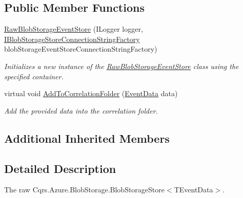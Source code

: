 \subsection*{Public Member Functions}
\begin{DoxyCompactItemize}
\item 
\hyperlink{classCqrs_1_1Azure_1_1BlobStorage_1_1Events_1_1BlobStorageEventStore_1_1RawBlobStorageEventStore_a42832e52a20eeb7012526624181f457c_a42832e52a20eeb7012526624181f457c}{Raw\+Blob\+Storage\+Event\+Store} (I\+Logger logger, \hyperlink{interfaceCqrs_1_1Azure_1_1BlobStorage_1_1IBlobStorageStoreConnectionStringFactory}{I\+Blob\+Storage\+Store\+Connection\+String\+Factory} blob\+Storage\+Event\+Store\+Connection\+String\+Factory)
\begin{DoxyCompactList}\small\item\em Initializes a new instance of the \hyperlink{classCqrs_1_1Azure_1_1BlobStorage_1_1Events_1_1BlobStorageEventStore_1_1RawBlobStorageEventStore}{Raw\+Blob\+Storage\+Event\+Store} class using the specified container. \end{DoxyCompactList}\item 
virtual void \hyperlink{classCqrs_1_1Azure_1_1BlobStorage_1_1Events_1_1BlobStorageEventStore_1_1RawBlobStorageEventStore_abc257daaf9e528dc5d6ddfff649bdeda_abc257daaf9e528dc5d6ddfff649bdeda}{Add\+To\+Correlation\+Folder} (\hyperlink{classCqrs_1_1Events_1_1EventData}{Event\+Data} data)
\begin{DoxyCompactList}\small\item\em Add the provided {\itshape data}  into the correlation folder. \end{DoxyCompactList}\end{DoxyCompactItemize}
\subsection*{Additional Inherited Members}


\subsection{Detailed Description}
The raw Cqrs.\+Azure.\+Blob\+Storage.\+Blob\+Storage\+Store$<$\+T\+Event\+Data$>$. 



